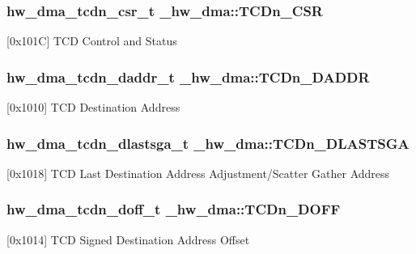 \subsubsection[{\texorpdfstring{T\+C\+Dn\+\_\+\+C\+SR}{TCDn_CSR}}]{ {\bf hw\+\_\+dma\+\_\+tcdn\+\_\+csr\+\_\+t} \+\_\+hw\+\_\+dma\+::\+T\+C\+Dn\+\_\+\+C\+SR}\hypertarget{struct__hw__dma_a83d4444b2d7dbe98f3bd8255c93473a6}{}\label{struct__hw__dma_a83d4444b2d7dbe98f3bd8255c93473a6}
\mbox{[}0x101C\mbox{]} T\+CD Control and Status 
\subsubsection[{\texorpdfstring{T\+C\+Dn\+\_\+\+D\+A\+D\+DR}{TCDn_DADDR}}]{ {\bf hw\+\_\+dma\+\_\+tcdn\+\_\+daddr\+\_\+t} \+\_\+hw\+\_\+dma\+::\+T\+C\+Dn\+\_\+\+D\+A\+D\+DR}\hypertarget{struct__hw__dma_a46ea4c788ba8cc38fc0fdba7a91af030}{}\label{struct__hw__dma_a46ea4c788ba8cc38fc0fdba7a91af030}
\mbox{[}0x1010\mbox{]} T\+CD Destination Address 
\subsubsection[{\texorpdfstring{T\+C\+Dn\+\_\+\+D\+L\+A\+S\+T\+S\+GA}{TCDn_DLASTSGA}}]{ {\bf hw\+\_\+dma\+\_\+tcdn\+\_\+dlastsga\+\_\+t} \+\_\+hw\+\_\+dma\+::\+T\+C\+Dn\+\_\+\+D\+L\+A\+S\+T\+S\+GA}\hypertarget{struct__hw__dma_a49ed074d750937618978b55a9f9d939b}{}\label{struct__hw__dma_a49ed074d750937618978b55a9f9d939b}
\mbox{[}0x1018\mbox{]} T\+CD Last Destination Address Adjustment/\+Scatter Gather Address 
\subsubsection[{\texorpdfstring{T\+C\+Dn\+\_\+\+D\+O\+FF}{TCDn_DOFF}}]{ {\bf hw\+\_\+dma\+\_\+tcdn\+\_\+doff\+\_\+t} \+\_\+hw\+\_\+dma\+::\+T\+C\+Dn\+\_\+\+D\+O\+FF}\hypertarget{struct__hw__dma_a481bd0bb06736725200f36022b1928da}{}\label{struct__hw__dma_a481bd0bb06736725200f36022b1928da}
\mbox{[}0x1014\mbox{]} T\+CD Signed Destination Address Offset 
